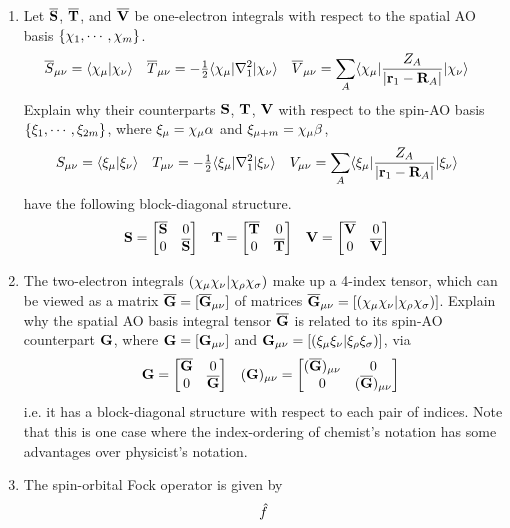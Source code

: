 \documentclass[fleqn,11pt]{article}
\begin{document}
\begin{enumerate}
  \item Let $\overline{\mathbf{S}}$, $\overline{\mathbf{T}}$, and $\overline{\mathbf{V}}$ be one-electron integrals with respect to the spatial AO basis $\{\chi_1,\cdots,\chi_m\}$.
\begin{align}
\label{space-ao-ints}
&
  \overline{S}_{\mu\nu}
=
  \langle\chi_{\mu}|\chi_{\nu}\rangle
&&
  \overline{T}_{\mu\nu}
=
  -\tfrac{1}{2}\langle\chi_{\mu}|\nabla_1^2|\chi_{\nu}\rangle
&&
  \overline{V}_{\mu\nu}
=
  \sum_A\langle\chi_{\mu}|\dfrac{Z_A}{|\mathbf{r}_1-\mathbf{R}_A|}|\chi_{\nu}\rangle
\end{align}
  Explain why their counterparts $\mathbf{S}$, $\mathbf{T}$, $\mathbf{V}$ with respect to the spin-AO basis $\{\xi_1,\cdots,\xi_{2m}\}$, where $\xi_\mu=\chi_\mu\alpha$ and $\xi_{\mu+m}=\chi_\mu\beta$,
\begin{align}
\label{space-ao-ints}
&
  S_{\mu\nu}
=
  \langle\xi_{\mu}|\xi_{\nu}\rangle
&&
  T_{\mu\nu}
=
  -\tfrac{1}{2}\langle\xi_{\mu}|\nabla_1^2|\xi_{\nu}\rangle
&&
  V_{\mu\nu}
=
  \sum_A\langle\xi_{\mu}|\dfrac{Z_A}{|\mathbf{r}_1-\mathbf{R}_A|}|\xi_{\nu}\rangle
\end{align}
have the following block-diagonal structure.
\begin{align}
\label{spin-ao-ints-1}
&
  \mathbf{S}
=
  \begin{bmatrix}\overline{\mathbf{S}}&0\\0&\overline{\mathbf{S}}\end{bmatrix}
&&
  \mathbf{T}
=
  \begin{bmatrix}\overline{\mathbf{T}}&0\\0&\overline{\mathbf{T}}\end{bmatrix}
&&
  \mathbf{V}
=
  \begin{bmatrix}\overline{\mathbf{V}}&0\\0&\overline{\mathbf{V}}\end{bmatrix}
\end{align}
  \item The two-electron integrals $(\chi_\mu\chi_\nu|\chi_\rho\chi_\sigma)$ make up a 4-index tensor, which can be viewed as a matrix $\overline{\mathbf{G}}=[\overline{\mathbf{G}}_{\mu\nu}]$ of matrices $\overline{\mathbf{G}}_{\mu\nu}=[(\chi_\mu\chi_\nu|\chi_\rho\chi_\sigma)]$.
  Explain why the spatial AO basis integral tensor $\overline{\mathbf{G}}$ is related to its spin-AO counterpart $\mathbf{G}$, where $\mathbf{G}=[\mathbf{G}_{\mu\nu}]$ and $\mathbf{G}_{\mu\nu}=[(\xi_\mu\xi_\nu|\xi_\rho\xi_\sigma)]$, via
\begin{align}
&&
  \mathbf{G}
=
  \begin{bmatrix}\overline{\mathbf{G}}&0\\0&\overline{\mathbf{G}}\end{bmatrix}
&&
  (\mathbf{G})_{\mu\nu}
=
  \begin{bmatrix}(\overline{\mathbf{G}})_{\mu\nu}&0\\0&(\overline{\mathbf{G}})_{\mu\nu}\end{bmatrix}
\end{align}
  i.e. it has a block-diagonal structure with respect to each pair of indices.
  Note that this is one case where the index-ordering of chemist's notation has some advantages over physicist's notation.
  \item The spin-orbital Fock operator is given by
\begin{align}
  \op{f}

\end{align}
\end{enumerate}
\end{document}
